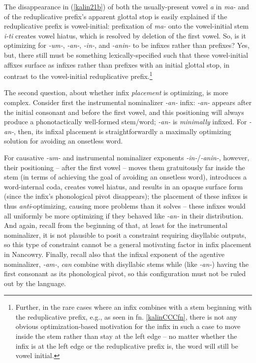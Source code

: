\documentclass[output=paper]{langscibook}
\begin{document}
\noindent The disappearance in (\ref{kalin21b}) of both the usually-present vowel \textit{a} in \textit{ma-} and of the reduplicative prefix's apparent glottal stop is easily explained if the reduplicative prefix is vowel-initial: prefixation of \textit{ma-} onto the vowel-initial stem \textit{i-ti} creates vowel hiatus, which is resolved by deletion of the first vowel. So, is it optimizing for \textit{-um-}, \textit{-an-}, \textit{-in-}, and \textit{-anin-} to be infixes rather than prefixes? Yes, but, there still must be something lexically-specified such that these vowel-initial affixes surface as infixes rather than prefixes with an initial glottal stop, in contrast to the vowel-initial reduplicative prefix.\footnote{Further, in the rare cases where an infix combines with a stem beginning with the reduplicative prefix, e.g., as seen in fn. \ref{kalinCCCfn}, there is not any obvious optimization-based motivation for the infix in such a case to move inside the stem rather than stay at the left edge -- no matter whether the infix is at the left edge or the reduplicative prefix is, the word will still be vowel initial.}

The second question, about whether infix \textit{placement} is optimizing, is more complex. Consider first the instrumental nominalizer \textit{-an-} infix: \textit{-an-} appears after the initial consonant and before the first vowel, and this positioning will always produce a phonotactically well-formed stem/word; \textit{-an-} is \textit{minimally} infixed. For \textit{-an-}, then, its infixal placement is straightforwardly a maximally optimizing solution for avoiding an onsetless word. 

For causative \textit{-um-} and instrumental nominalizer exponents \textit{-in-}/\textit{-anin-}, however, their positioning -- after the first vowel -- moves them gratuitously far inside the stem (in terms of achieving the goal of avoiding an onsetless word), introduces a word-internal coda, creates vowel hiatus, and results in an opaque surface form (since the infix's phonological pivot disappears); the placement of these infixes is thus \textit{anti}-optimizing, causing more problems than it solves -- these infixes would all uniformly be more optimizing if they behaved like \textit{-an-} in their distribution. And again, recall from the beginning of  that, at least for the instrumental nominalizer, it is not plausible to posit a constraint requiring disyllabic outputs, so this type of constraint cannot be a general motivating factor in infix placement in Nancowry. Finally, recall also that the infixal exponent of the agentive nominalizer, \textit{-am-}, \textit{can} combine with disyllabic stems while (like \textit{-an-}) having the first consonant as its phonological pivot, so this configuration must not be ruled out by the language. 
\end{document}
